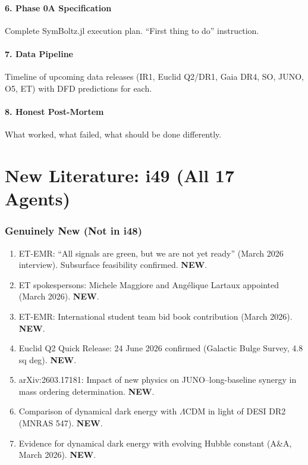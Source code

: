 \documentclass[11pt,a4paper]{article}
\newcommand{\NEW}{\textcolor{dfdblue}{\textbf{NEW}}}
\begin{document}
\subsection{6. Phase 0A Specification}
Complete SymBoltz.jl execution plan. ``First thing to do'' instruction.

\subsection{7. Data Pipeline}
Timeline of upcoming data releases (IR1, Euclid Q2/DR1, Gaia DR4, SO, JUNO, O5, ET) with DFD predictions for each.

\subsection{8. Honest Post-Mortem}
What worked, what failed, what should be done differently.


\part{New Literature: i49 (All 17 Agents)}

\section{Genuinely New (Not in i48)}

\begin{enumerate}
\item ET-EMR: ``All signals are green, but we are not yet ready'' (March 2026 interview). Subsurface feasibility confirmed. \NEW.
\item ET spokespersons: Michele Maggiore and Ang\'elique Lartaux appointed (March 2026). \NEW.
\item ET-EMR: International student team bid book contribution (March 2026). \NEW.
\item Euclid Q2 Quick Release: 24 June 2026 confirmed (Galactic Bulge Survey, 4.8 sq deg). \NEW.
\item arXiv:2603.17181: Impact of new physics on JUNO--long-baseline synergy in mass ordering determination. \NEW.
\item Comparison of dynamical dark energy with $\Lambda$CDM in light of DESI DR2 (MNRAS 547). \NEW.
\item Evidence for dynamical dark energy with evolving Hubble constant (A\&A, March 2026). \NEW.
\end{enumerate}
\end{document}
